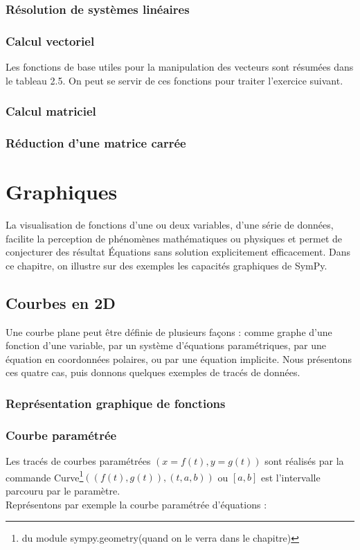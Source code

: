   \subsection{Résolution de systèmes linéaires}
  \subsection{Calcul vectoriel}
  Les fonctions de base utiles pour la manipulation des vecteurs sont résumées dans le tableau 2.5. On peut se servir de ces fonctions pour traiter l'exercice suivant.
  \subsection{Calcul matriciel} 
  \subsection{Réduction d'une matrice carrée}
 \chapter{Graphiques}
La visualisation de fonctions d'une ou deux variables, d'une série de données, facilite la perception de phénomènes mathématiques ou physiques et permet de conjecturer des résultat Équations sans solution explicitement efficacement. Dans ce chapitre, on illustre sur des exemples les capacités graphiques de SymPy.
 \section{Courbes en 2D}
 Une courbe plane peut être définie de plusieurs façons : comme graphe d'une fonction d'une variable, par un système d'équations paramétriques, par une équation en coordonnées polaires, ou par une équation implicite. Nous présentons
ces quatre cas, puis donnons quelques exemples de tracés de données.
 \subsection{Représentation graphique de fonctions}
 \subsection{Courbe paramétrée}
 Les tracés de courbes paramétrées $(x = f(t), y=g(t))$ sont réalisés par la commande Curve\footnote{du module sympy.geometry(quand on le verra dans le chapitre)}$((f(t), g(t)), (t, a, b))$ ou $\left[a, b\right]$ est l'intervalle parcouru par le paramètre.
 \\
 Représentons par exemple la courbe paramétrée d'équations :
  
